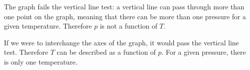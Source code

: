 The graph fails the vertical line test: a vertical line can pass through more than one point
on the graph, meaning that there can be more than one pressure for a given temperature.
Therefore $p$ is not a function of $T$.

If we were to interchange the axes of the graph, it would pass the vertical line test.
Therefore $T$ can be described as a function of $p$. For a given pressure, there is only
one temperature.
